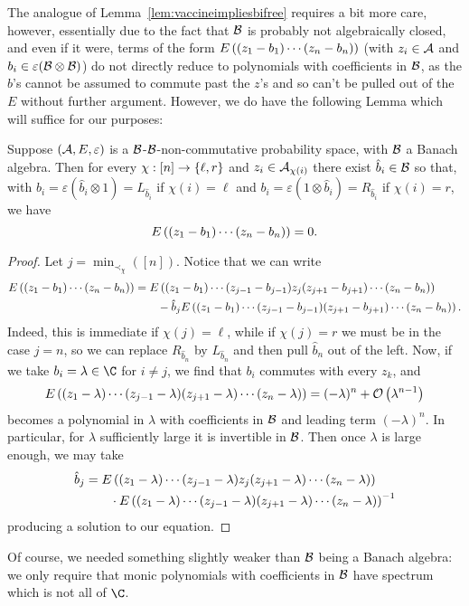 	  The analogue of Lemma~\ref{lem:vaccineimpliesbifree} requires a bit more care, however, essentially due to the fact that $\mathcal{B}$ is probably not algebraically closed, and even if it were, terms of the form $E\left((z_1-b_1)\cdots(z_n-b_n)\right)$ (with $z_i \in \mathcal{A}$ and $b_i \in \varepsilon(\mathcal{B}\otimes\mathcal{B})$) do not directly reduce to polynomials with coefficients in $\mathcal{B}$, as the $b$'s cannot be assumed to commute past the $z$'s and so can't be pulled out of the $E$ without further argument.
	  However, we do have the following Lemma which will suffice for our purposes:
	  \begin{lemma}
		  Suppose $(\mathcal{A}, E, \varepsilon)$ is a $\mathcal{B}$-$\mathcal{B}$-non-commutative probability space, with $\mathcal{B}$ a Banach algebra.
		  Then for every $\chi : [n] \to \left\{\ell, r\right\}$ and $z_i \in \mathcal{A}_{\chi(i)}$ there exist $\hat b_i \in \mathcal{B}$ so that, with $b_i = \varepsilon(\hat b_i\otimes1) = L_{\hat b_i}$ if $\chi(i) = \ell$ and $b_i = \varepsilon(1\otimes \hat b_i) = R_{\hat b_i}$ if $\chi(i) = r$, we have
		  $$
		  E\left((z_1-b_1)\cdots (z_n-b_n)\right) = 0.
		  $$
	  \end{lemma}

	  \begin{proof}
		  Let $j = \min_{\prec_\chi}([n])$.
		  Notice that we can write
		  \begin{align*}
			  E\left((z_1-b_1)\cdots (z_n-b_n)\right)
			  &= E\left((z_1-b_1)\cdots(z_{j-1}-b_{j-1})z_j(z_{j+1}-b_{j+1})\cdots(z_n-b_n)\right) \\
			  &\qquad- \hat b_jE\left((z_1-b_1)\cdots(z_{j-1}-b_{j-1})(z_{j+1}-b_{j+1})\cdots(z_n-b_n)\right).
		  \end{align*}
		  Indeed, this is immediate if $\chi(j) = \ell$, while if $\chi(j) = r$ we must be in the case $j = n$, so we can replace $R_{\hat b_n}$ by $L_{\hat b_n}$ and then pull $\hat b_n$ out of the left.
		  Now, if we take $b_i = \lambda \in \C$ for $i \neq j$, we find that $b_i$ commutes with every $z_k$, and
		  $$E\left((z_1-\lambda)\cdots(z_{j-1}-\lambda)(z_{j+1}-\lambda)\cdots(z_n-\lambda)\right) = (-\lambda)^n + \mathcal{O}\left(\lambda^{n-1}\right)$$
		  becomes a polynomial in $\lambda$ with coefficients in $\mathcal{B}$ and leading term $(-\lambda)^n$.
		  In particular, for $\lambda$ sufficiently large it is invertible in $\mathcal{B}$.
		  Then once $\lambda$ is large enough, we may take
		  \begin{align*}
			  \hat b_j
			  &= {E\left((z_1-\lambda)\cdots(z_{j-1}-\lambda)z_j(z_{j+1}-\lambda)\cdots(z_n-\lambda)\right)} \\
			  &\qquad \cdot{E\left((z_1-\lambda)\cdots(z_{j-1}-\lambda)(z_{j+1}-\lambda)\cdots(z_n-\lambda)\right)}^{-1}
		  \end{align*}
		  producing a solution to our equation.
	  \end{proof}
	  Of course, we needed something slightly weaker than $\mathcal{B}$ being a Banach algebra: we only require that monic polynomials with coefficients in $\mathcal{B}$ have spectrum which is not all of $\C$.

